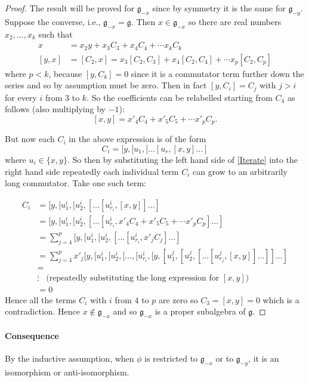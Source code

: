 \documentclass[honours]{UNSWthesis}
\newcommand{\g}{\mathfrak{g}}
\newcommand{\1}{\mathbf{e}_{1}}
\newcommand{\2}{\mathbf{e}_{3}}
\newcommand{\3}{\mathbf{e}_{3}}
\begin{document}
\begin{proof}
The result will be proved for $\g_{-x}$ since by symmetry it is the same for $\g_{-y}$. Suppose the converse, i.e., $\g_{-x}=\g$. Then $x \in \g_{-x}$ so there are real numbers $x_{2},\ldots,x_{k}$ such that
\begin{align*}
x&= x_{2}y +x_{3}C_{3}+ x_{4}C_{4}+\cdots x_{k}C_{k}\\
[y,x]&= [C_{2},x]=x_{3}[C_{2},C_{3}]+x_{4}[C_{2},C_{4}]+\cdots x_{p}[C_{2},C_{p}]
\end{align*}
where $p < k$, because $[y,C_{k}]=0$ since it is a commutator term further down the series and so by assumption must be zero. Then in fact $[y,C_{i}]=C_{j}$ with $j >i$ for every $i$ from $3$ to $k$. So the coefficients can be relabelled starting from $C_{4}$ as follows (also multiplying by $-1$):
\begin{equation}\label{Iterate}
[x,y]=x'_{4}C_{4}+x'_{5}C_{5}+\cdots x'_{p}C_{p}.
\end{equation}

But now each $C_{i}$ in the above expression is of the form 
\[
C_{i}=[y,[u_{1},[\ldots[u_{r},[x,y]\ldots]
\]
where $u_{i} \in \{x,y\}$. So then by substituting the left hand side of \ref{Iterate} into the right hand side repeatedly each individual term $C_{i}$ can grow to an arbitrarily long commutator. Take one such term: 
 
\begin{align*}
C_{i} &=[y,[u_{1}^{i},[u_{2}^{i},[\ldots[u_{r_{i}}^{i},[x,y]]\ldots]  \\
 &=[y,[u_{1}^{i},[u_{2}^{i},[\ldots [u_{r_{i}}^{i},x'_{4}C_{4}+x'_{5}C_{5}+\cdots x'_{p}C_{p}]\ldots]\\
 &=\sum\limits_{j=4}^{p}[y,[u_{1}^{i},[u_{2}^{i},[\ldots [u_{r_{i}}^{i},x'_{j}C_{j}]\ldots]\\
 &=\sum\limits_{j=4}^{p}x'_{j}[y,[u_{1}^{i},[u_{2}^{i},[\ldots,[u_{r_{i}}^{i},[y,[u_{1}^{j},[u_{2}^{j},[\ldots[u_{r_{j}}^{j},[x,y]]\ldots]]\ldots]\\
 &=\\
 &\vdots \;\;\; \text{(repeatedly substituting the long expression for $[x,y]$)}\\
 &=0
\end{align*}
Hence all the terms $C_{i}$ with $i$ from $4$ to $p$ are zero so $C_{3}=[x,y]=0$ which is a contradiction. Hence $x \notin \g_{-x}$ and so $\g_{-x}$ is a proper subalgebra of $\g$.
\end{proof}

\paragraph*{Consequence}
By the inductive assumption, when $\phi$ is restricted to $\g_{-x}$ or to $\g_{-y}$, it is an isomorphism or anti-isomorphism.
\end{document}
